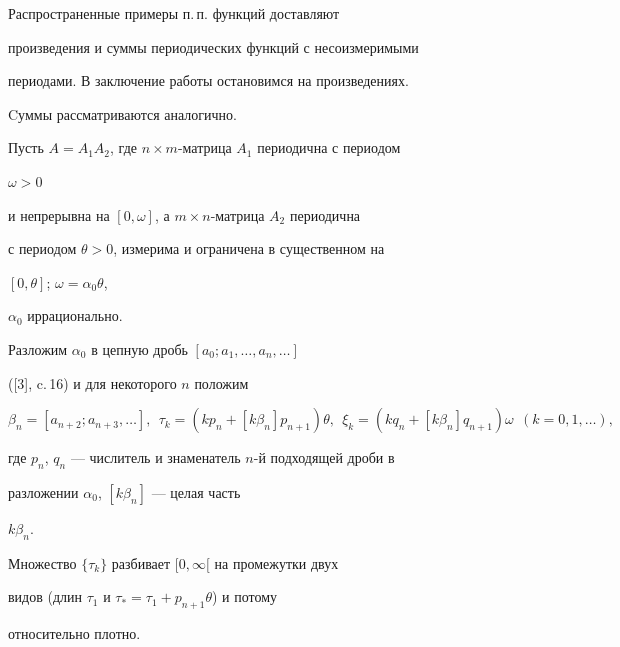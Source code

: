  


Распространенные примеры п.\,п. функций доставляют 


произведения и суммы периодических функций с несоизмеримыми 


периодами. В заключение работы остановимся на произведениях.


Cуммы рассматриваются аналогично. 


 


Пусть $A=A_1A_2$, где $n\times m$-матрица $A_1$ периодична с периодом 


$\omega>0$ 


и непрерывна на $[0,\omega]$, а $m\times n$-матрица $A_2$ периодична 


с периодом $\theta>0$, измерима и ограничена в существенном на 


$[0,\theta]$; $\omega=\alpha_0\theta$, 


$\alpha_0$ иррационально. 


 


Разложим $\alpha_0$ в цепную дробь $[a_0;a_1,\dotsc,a_n,\dotsc]$


([3], c.\,16) и для некоторого $n$ положим 


$$ 


\beta_n=[a_{n+2};a_{n+3},\dotsc],\ \ 


\tau_k=(k p_n+[k\beta_n]p_{n+1})\theta,\ \ 


\xi_k=(k q_n+[k\beta_n]q_{n+1})\omega\ \ 


(k=0,1,\dotsc), 


$$ 


где $p_n$, $q_n$ --- числитель и знаменатель $n$-й подходящей дроби в 


разложении $\alpha_0$, $[k\beta_n]$ --- целая часть 


$k\beta_n$. 


 


\begin{notenonum} 


Множество $\{\tau_k\}$ разбивает $[0,\infty[$ на промежутки двух 


видов (длин $\tau_1$ и $\tau_*=\tau_1+p_{n+1}\theta$) и потому 


относительно плотно. 


\end{notenonum} 


 



